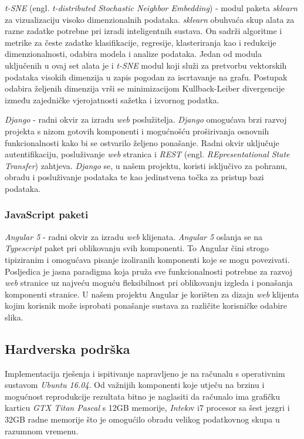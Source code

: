 \documentclass[times, utf8, proizvoljni, numeric]{fer}
\begin{document}
\textit{t-SNE} (engl. \textit{t-distributed Stochastic Neighbor Embedding}) \cite{TSNE} - modul paketa \textit{sklearn} za vizualizaciju visoko dimenzionalnih podataka. \textit{sklearn} obuhvaća skup alata za razne zadatke potrebne pri izradi inteligentnih sustava. On sadrži algoritme i metrike za česte zadatke klasifikacije, regresije, klasteriranja kao i redukcije dimenzionalnosti, odabira modela i analize podataka. Jedan od modula uključenih u ovaj set alata je i \textit{t-SNE} modul koji služi za pretvorbu vektorskih podataka visokih dimenzija u zapis pogodan za iscrtavanje na grafu. Postupak odabira željenih dimenzija vrši se minimizacijom Kullback-Leiber divergencije između zajedničke vjerojatnosti sažetka i izvornog podatka.


\textit{Django} \cite{django}- radni okvir za izradu \textit{web} poslužitelja. \textit{Django} omogućava brzi razvoj projekta s nizom gotovih komponenti i mogućnošću proširivanja osnovnih funkcionalnosti kako bi se ostvarilo željeno ponašanje. Radni okvir uključuje autentifikaciju, posluživanje \textit{web} stranica i \textit{REST} (engl. \textit{REpresentational State Transfer}) zahtjeva. \textit{Django} se, u našem projektu, koristi isključivo za pohranu, obradu i posluživanje podataka te kao jedinstvena točka za pristup bazi podataka. 


\subsubsection{JavaScript paketi}

\textit{Angular 5} \cite{angular} - radni okvir za izradu \textit{web} klijenata. \textit{Angular 5} oslanja se na \textit{Typescript} paket pri oblikovanju svih komponenti. To Angular čini strogo tipiziranim i omogućava pisanje izoliranih komponenti koje se mogu povezivati. Posljedica je jasna paradigma koja pruža sve funkcionalnosti potrebne za razvoj \textit{web} stranice uz najveću moguću fleksibilnost pri oblikovanju izgleda i ponašanja komponenti stranice. U našem projektu Angular je korišten za dizajn \textit{web} klijenta kojim korisnik može isprobati ponašanje sustava za različite korisničke odabire slika.



\subsection{Hardverska podrška}
Implementacija rješenja i ispitivanje napravljeno je na računalu s operativnim sustavom \textit{Ubuntu 16.04}. Od važnijih komponenti koje utječu na brzinu i mogućnost reprodukcije rezultata bitno je naglasiti da računalo ima grafičku karticu \textit{GTX Titan Pascal} s 12GB memorije, \textit{Intel}ov i7 procesor sa šest jezgri i 32GB radne memorije što je omogućilo obradu velikog podatkovnog skupa u razumnom vremenu.
\end{document}
